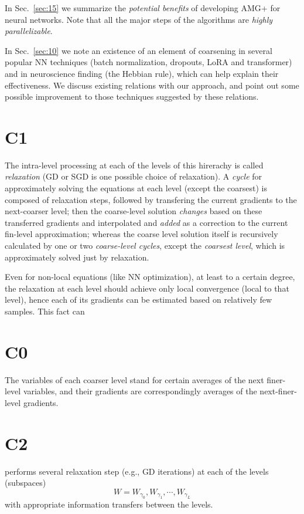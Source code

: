 \documentclass{article} %
\begin{document}
In Sec.~\ref{sec:15} we summarize the {\it potential benefits} of developing AMG+ for neural networks. Note that all the major steps of the algorithms are {\it highly parallelizable}.

In Sec.~\ref{sec:10} we note an existence of an element of coarsening in several popular NN techniques (batch normalization, dropouts, LoRA and transformer) and in neuroscience finding (the Hebbian rule), which can help explain their effectiveness. We discuss existing relations with our approach, and point out some possible improvement to those techniques suggested by these relations.

\section{C1}
The intra-level processing at each of the levels of this hirerachy is called {\it relaxation} (GD or SGD is one possible choice of relaxation). A {\it cycle} for approximately solving the equations at each level (except the coarsest) is composed of relaxation steps, followed by transfering the current gradients to the next-coarser level; then the coarse-level solution {\it changes} based on these transferred gradients and interpolated and {\it added} as a correction to the current fin-level approximation; whereas the coarse level solution itself is recursively calculated by one or two {\it coarse-level cycles}, except the {\it coarsest level}, which is approximately solved just by relaxation.

Even for non-local equations (like NN optimization), at least to a certain degree, the relaxation at each level should achieve only local convergence (local to that level), hence each of its gradients can be estimated based on relatively few samples. This fact can

\section{C0}
The variables of each coarser level stand for certain averages of the next finer-level variables, and their gradients are correspondingly averages of the next-finer-level gradients.

\section{C2}
performs several relaxation step (e.g., GD iterations) at each of the levels (subspaces)
$$ W = W_{\gamma_0}, W_{\gamma_1}, \cdots, W_{\gamma_L} $$
with appropriate information transfers between the levels.
\end{document}
